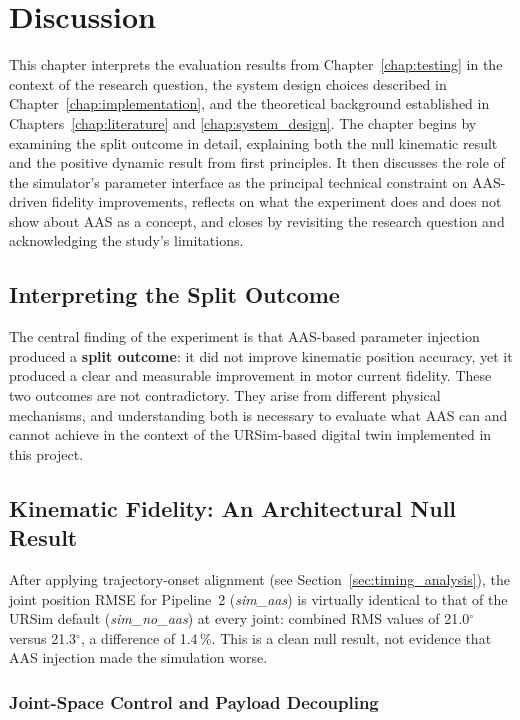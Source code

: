\chapter{Discussion}
\label{chap:discussion}

This chapter interprets the evaluation results from Chapter~\ref{chap:testing} in the context of
the research question, the system design choices described in Chapter~\ref{chap:implementation},
and the theoretical background established in Chapters~\ref{chap:literature} and
\ref{chap:system_design}.
The chapter begins by examining the split outcome in detail, explaining both the null kinematic
result and the positive dynamic result from first principles.
It then discusses the role of the simulator's parameter interface as the principal technical
constraint on AAS-driven fidelity improvements, reflects on what the experiment does and does not
show about AAS as a concept, and closes by revisiting the research question and acknowledging the
study's limitations.


\section{Interpreting the Split Outcome}
\label{sec:discussion_split}

The central finding of the experiment is that AAS-based parameter injection produced a
\textbf{split outcome}: it did not improve kinematic position accuracy, yet it produced a clear
and measurable improvement in motor current fidelity.
These two outcomes are not contradictory.
They arise from different physical mechanisms, and understanding both is necessary to evaluate what
AAS can and cannot achieve in the context of the URSim-based digital twin implemented in this
project.


\section{Kinematic Fidelity: An Architectural Null Result}
\label{sec:discussion_kinematics}

After applying trajectory-onset alignment (see Section~\ref{sec:timing_analysis}), the
joint position RMSE for Pipeline~2 (\textit{sim\_aas}) is virtually identical to that of
the URSim default (\textit{sim\_no\_aas}) at every joint: combined RMS values of 21.0$^\circ$
versus 21.3$^\circ$, a difference of 1.4\,\%.
This is a clean null result, not evidence that AAS injection made the simulation worse.

\subsection{Joint-Space Control and Payload Decoupling}

